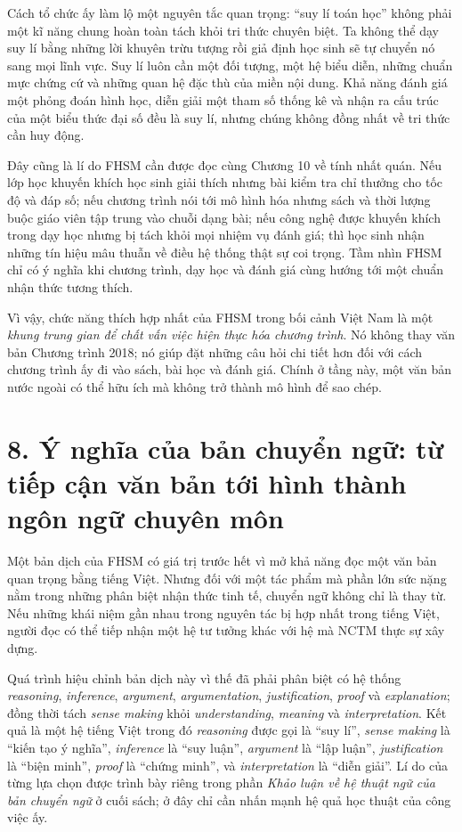 Cách tổ chức ấy làm lộ một nguyên tắc quan trọng: ``suy lí toán học'' không
phải một kĩ năng chung hoàn toàn tách khỏi tri thức chuyên biệt. Ta không thể
dạy suy lí bằng những lời khuyên trừu tượng rồi giả định học sinh sẽ tự chuyển
nó sang mọi lĩnh vực. Suy lí luôn cần một đối tượng, một hệ biểu diễn, những
chuẩn mực chứng cứ và những quan hệ đặc thù của miền nội dung. Khả năng đánh
giá một phỏng đoán hình học, diễn giải một tham số thống kê và nhận ra cấu trúc
của một biểu thức đại số đều là suy lí, nhưng chúng không đồng nhất về tri
thức cần huy động.

Đây cũng là lí do FHSM cần được đọc cùng Chương 10 về tính nhất quán. Nếu lớp
học khuyến khích học sinh giải thích nhưng bài kiểm tra chỉ thưởng cho tốc độ
và đáp số; nếu chương trình nói tới mô hình hóa nhưng sách và thời lượng buộc
giáo viên tập trung vào chuỗi dạng bài; nếu công nghệ được khuyến khích trong
dạy học nhưng bị tách khỏi mọi nhiệm vụ đánh giá; thì học sinh nhận những tín
hiệu mâu thuẫn về điều hệ thống thật sự coi trọng. Tầm nhìn FHSM chỉ có ý
nghĩa khi chương trình, dạy học và đánh giá cùng hướng tới một chuẩn nhận thức
tương thích.

Vì vậy, chức năng thích hợp nhất của FHSM trong bối cảnh Việt Nam là một
\emph{khung trung gian để chất vấn việc hiện thực hóa chương trình}. Nó không
thay văn bản Chương trình 2018; nó giúp đặt những câu hỏi chi tiết hơn đối với
cách chương trình ấy đi vào sách, bài học và đánh giá. Chính ở tầng này, một
văn bản nước ngoài có thể hữu ích mà không trở thành mô hình để sao chép.

\section*{8. Ý nghĩa của bản chuyển ngữ: từ tiếp cận văn bản tới hình thành ngôn ngữ chuyên môn}

Một bản dịch của FHSM có giá trị trước hết vì mở khả năng đọc một văn bản
quan trọng bằng tiếng Việt. Nhưng đối với một tác phẩm mà phần lớn sức nặng
nằm trong những phân biệt nhận thức tinh tế, chuyển ngữ không chỉ là thay từ.
Nếu những khái niệm gần nhau trong nguyên tác bị hợp nhất trong tiếng Việt,
người đọc có thể tiếp nhận một hệ tư tưởng khác với hệ mà NCTM thực sự xây
dựng.

Quá trình hiệu chỉnh bản dịch này vì thế đã phải phân biệt có hệ thống
\emph{reasoning}, \emph{inference}, \emph{argument},
\emph{argumentation}, \emph{justification}, \emph{proof} và
\emph{explanation}; đồng thời tách \emph{sense making} khỏi
\emph{understanding}, \emph{meaning} và \emph{interpretation}. Kết quả là
một hệ tiếng Việt trong đó \emph{reasoning} được gọi là ``suy lí'',
\emph{sense making} là ``kiến tạo ý nghĩa'', \emph{inference} là ``suy
luận'', \emph{argument} là ``lập luận'', \emph{justification} là ``biện
minh'', \emph{proof} là ``chứng minh'', và \emph{interpretation} là ``diễn
giải''. Lí do của từng lựa chọn được trình bày riêng trong phần
\emph{Khảo luận về hệ thuật ngữ của bản chuyển ngữ} ở cuối sách; ở đây chỉ
cần nhấn mạnh hệ quả học thuật của công việc ấy.

